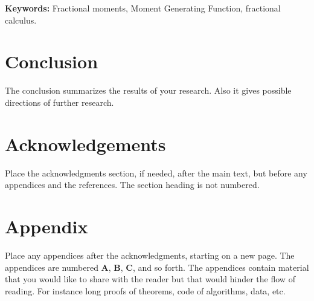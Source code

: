 \documentclass[a4paper,11pt]{article}
\theoremstyle{plain}
\numberwithin{theorem}{subsection}
\numberwithin{corollary}{subsection}
\numberwithin{proposition}{subsection}
\numberwithin{lemma}{subsection}
\numberwithin{assumption}{subsection}
\theoremstyle{definition}
\numberwithin{definition}{subsection}
\numberwithin{example}{subsection}
\numberwithin{remark}{subsection}
\numberwithin{notation}{subsection}
\begin{document}
\bigskip\noindent
\textbf{Keywords:} Fractional moments, Moment Generating Function, fractional calculus.










\section{Conclusion}\label{s:con}
The conclusion summarizes the results of your research.
Also it gives possible directions of further research.

\section*{Acknowledgements}
Place the acknowledgments section, if needed, after the main text, 
but before any appendices and the references. The section heading is not numbered.

\newpage
\appendix


\section{Appendix}\label{s:app1}
Place any appendices after the acknowledgments, starting on a new page.
The appendices are numbered
\textbf{A}, \textbf{B}, \textbf{C}, and so forth.
The appendices contain material that you would like to share with the
reader but that would hinder the flow of reading. For instance long
proofs of theorems, code of algorithms, data, etc.




\end{document}
